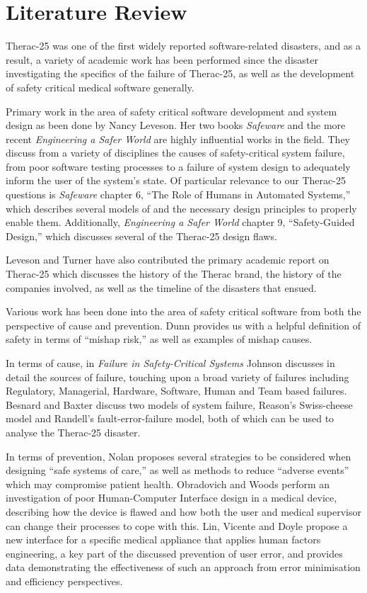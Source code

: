 \documentclass{cshonours}
\newcommand{\ther}{Therac-25\xspace}
\begin{document}
\chapter{Literature Review}
\label{chap:litreview}
\ther was one of the first widely reported software-related disasters, and as a result, a variety of academic work has been performed since the disaster investigating the specifics of the failure of \ther, as well as the development of safety critical  medical software generally.

Primary work in the area of safety critical software development and system design as been done by Nancy Leveson. Her two books \textit{Safeware} \cite{safeware} and the more recent \textit{Engineering a Safer World} \cite{saferworld} are highly influential works in the field. They discuss from a variety of disciplines the causes of safety-critical system failure, from poor software testing processes to a failure of system design to adequately inform the user of the system's state. Of particular relevance to our \ther questions is \textit{Safeware} chapter 6, ``The Role of Humans in Automated Systems,'' which describes several models of \hci and the necessary design principles to properly enable them. Additionally, \textit{Engineering a Safer World} chapter 9, ``Safety-Guided Design,'' which discusses several of the \ther design flaws.

Leveson and Turner \cite{leveson1993investigation} have also contributed the primary academic report on \ther which discusses the history of the Therac brand, the history of the companies involved, as well as the timeline of the disasters that ensued.

Various work has been done into the area of safety critical software from both the perspective of cause and prevention. Dunn \cite{dunn2003designing} provides us with a helpful definition of safety in terms of ``mishap risk,'' as well as examples of mishap causes.

In terms of cause, in \textit{Failure in Safety-Critical Systems} \cite[ch.~3]{johnson2003failure} Johnson discusses in detail the sources of failure, touching upon a broad variety of failures including Regulatory, Managerial, Hardware, Software, Human and Team based failures. Besnard and Baxter \cite{besnard2003human} discuss two models of system failure, Reason's Swiss-cheese model and Randell's fault-error-failure model, both of which can be used to analyse the \ther disaster.

In terms of prevention, Nolan \cite{nolan2000system} proposes several strategies to be considered when designing ``safe systems of care,'' as well as methods to reduce ``adverse events''  which may compromise patient health. Obradovich and Woods \cite{obradovich1996users} perform an investigation of poor Human-Computer Interface design in a medical device, describing how the device is flawed and how both the user and medical supervisor can change their processes to cope with this. Lin, Vicente and Doyle \cite{lin2001patient} propose a new interface for a specific medical appliance that applies human factors engineering, a key part of the discussed prevention of user error, and provides data demonstrating the effectiveness of such an approach from error minimisation and efficiency perspectives.
\end{document}

